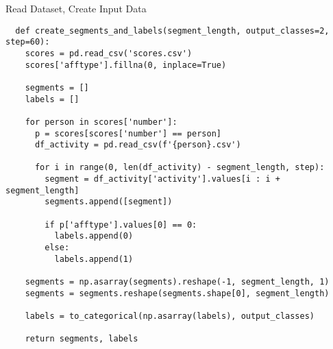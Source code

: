 \begin{code}
  \caption{Read Dataset, Create Input Data}
  \label{code:reading_dataset}
  
  \begin{verbatim}
  def create_segments_and_labels(segment_length, output_classes=2, step=60):
    scores = pd.read_csv('scores.csv')
    scores['afftype'].fillna(0, inplace=True)
    
    segments = []
    labels = []

    for person in scores['number']:
      p = scores[scores['number'] == person]
      df_activity = pd.read_csv(f'{person}.csv')

      for i in range(0, len(df_activity) - segment_length, step):
        segment = df_activity['activity'].values[i : i + segment_length]
        segments.append([segment])

        if p['afftype'].values[0] == 0: 
          labels.append(0)
        else:
          labels.append(1)

    segments = np.asarray(segments).reshape(-1, segment_length, 1)
    segments = segments.reshape(segments.shape[0], segment_length)

    labels = to_categorical(np.asarray(labels), output_classes)
    
    return segments, labels
  \end{verbatim}
\end{code}